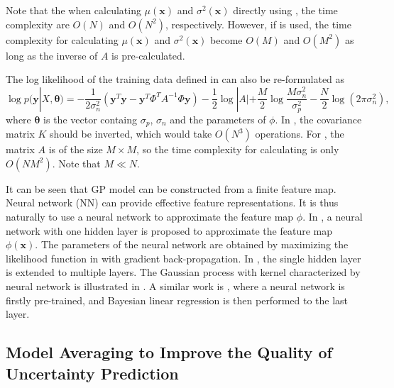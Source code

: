 Note that the when calculating $\mu(\bm{x})$ and $\sigma^2(\bm{x})$ directly using , the time complexity are $O(N)$ and $O(N^2)$, respectively. However, if  is used, the time complexity for calculating $\mu(\bm{x})$ and $\sigma^2(\bm{x})$ become $O(M)$ and $O(M^2)$ as long as the inverse of $A$ is pre-calculated.

The log likelihood of the training data defined in  can also be re-formulated as \cite{lazaro2010marginalized}
\begin{equation}
    \label{eq:DegenerateGPloglikelihood}
    \log p(\bm{y} | X, \bm{\theta}) = -\frac{1}{2\sigma_n^2}(\bm{y}^T\bm{y} - \bm{y}^T \Phi^T A^{-1} \Phi \bm{y}) - \frac{1}{2}\log |A| + \frac{M}{2} \log \frac{M \sigma_n^2}{\sigma_p^2} - \frac{N}{2} \log(2 \pi \sigma_n^2),
\end{equation}
where $\bm{\theta}$ is the vector containg $\sigma_p$, $\sigma_n$ and the parameters of $\phi$. In , the covariance matrix $K$ should be inverted, which would take $O(N^3)$ operations. For , the matrix $A$ is of the size $M \times M$, so the time complexity for calculating  is only $O(NM^2)$. Note that $M \ll N$.

It can be seen that GP model can be constructed from a finite feature map. Neural network (NN) can provide effective feature representations. It is thus naturally to use a neural network to approximate the feature map $\phi$. In \cite{lazaro2010marginalized}, a neural network with one hidden layer is proposed to approximate the feature map $\phi(\bm{x})$. The parameters of the neural network are obtained by maximizing the likelihood function in  with gradient back-propagation. In \cite{huang2015scalable}, the single hidden layer is extended to multiple layers. The Gaussian process with kernel characterized by neural network is illustrated in . A similar work is \cite{snoek2015scalable}, where a neural network is firstly pre-trained, and Bayesian linear regression is then performed to the last layer.

\subsection{Model Averaging to Improve the Quality of Uncertainty Prediction}\label{sec:deepensemble}

